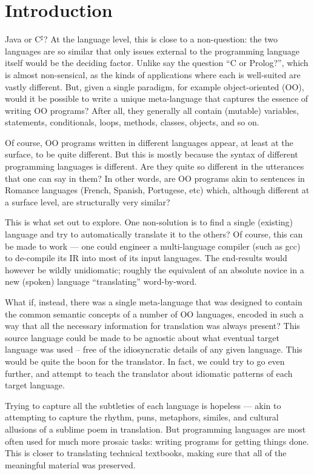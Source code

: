 \documentclass[sigplan,review,anonymous,prologue,dvipsnames]{acmart}
\newcommand{\Csharp}{C$^{\sharp}$}
\begin{document}
\section{Introduction}

Java or \Csharp? At the language level, this is close to a 
non-question: the two languages are so similar that only issues
external to the programming language itself would be the 
deciding factor.  Unlike say the question ``C or Prolog?'', which
is almost non-sensical, as the kinds of applications where each
is well-suited are vastly different.  But, given a single
paradigm, for example object-oriented (OO), would it be possible to
write a unique meta-language that captures the essence of writing
OO programs?  After all, they generally all contain (mutable)
variables, statements, conditionals, loops, methods, classes, objects,
and so on.

Of course, OO programs written in different languages appear, at
least at the surface, to be quite different. But this is mostly because
the syntax of different programming languages is different. Are they
quite so different in the utterances that one can say in them? In other
words, are OO programs akin to sentences in Romance languages
(French, Spanish, Portugese, etc) which, although different at a
surface level, are structurally very similar?

This is what set out to explore.  One non-solution is to find a single
(existing) language and try to automatically translate it to the others?
Of course, this can be made to work --- one could
engineer a multi-language compiler (such as gcc) to de-compile its
IR into most of its input languages.  The end-results would however
be wildly unidiomatic; roughly the equivalent of an absolute novice
in a new (spoken) language ``translating'' word-by-word.

What if, instead, there was a single meta-language that was designed to
contain the common semantic concepts of a number of OO languages, encoded
in such a way that all the necessary information for translation was always
present?  This source language could be made to be agnostic about what
eventual target language was used -- free of the idiosyncratic details of
any given language.  This would be quite the boon for the translator.
In fact, we could try to go even further, and attempt to teach the translator
about idiomatic patterns of each target language.

Trying to capture all the subtleties of each language is hopeless ---
akin to attempting to capture the rhythm, puns, metaphors, similes,
and cultural allusions of a sublime poem in translation.  But programming
languages are most often used for much more prosaic tasks: writing programs
for getting things done. This is closer to translating technical textbooks,
making sure that all of the meaningful material was preserved.
\end{document}
